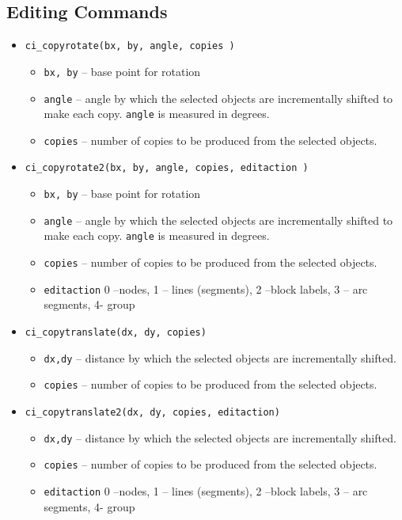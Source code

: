 \subsection{Editing Commands}
\begin{itemize}

\item{\tt ci\_copyrotate(bx, by, angle, copies )}
        \begin{itemize}
        \item{\tt bx, by} -- base point for rotation
        \item{\tt angle} -- angle by which the selected objects are incrementally
        shifted to make each copy.  {\tt angle} is measured in degrees.
        \item{\tt copies} -- number of copies to be produced from
        the selected objects.
        \end{itemize}

\item{\tt ci\_copyrotate2(bx, by, angle, copies, editaction )}
        \begin{itemize}
        \item{\tt bx, by} -- base point for rotation
        \item{\tt angle} -- angle by which the selected objects are incrementally
        shifted to make each copy.  {\tt angle} is measured in degrees.
        \item{\tt copies} -- number of copies to be produced from
        the selected objects.
        \item{\tt editaction}  0 --nodes, 1 -- lines (segments), 2 --block labels, 3 -- arc
                segments, 4- group
        \end{itemize}

\item{\tt ci\_copytranslate(dx, dy, copies)}
        \begin{itemize}
        \item{\tt dx,dy} -- distance by which the selected objects are incrementally shifted.
        \item{\tt copies} -- number of copies to be produced from the selected objects.
        \end{itemize}

\item{\tt ci\_copytranslate2(dx, dy, copies, editaction)}
        \begin{itemize}
        \item{\tt dx,dy} -- distance by which the selected objects are incrementally shifted.
        \item{\tt copies} -- number of copies to be produced from the selected objects.
        \item{\tt editaction}  0 --nodes, 1 -- lines (segments), 2 --block labels, 3 -- arc
                segments, 4- group
        \end{itemize}


\end{itemize}
